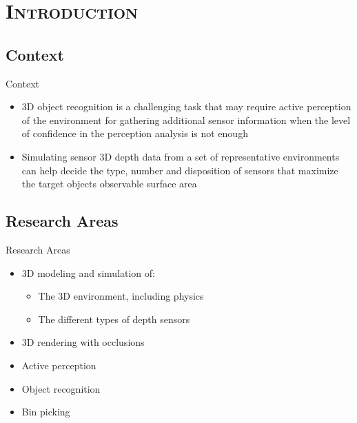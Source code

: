 \section{\scshape Introduction}\label{sec:introduction}

\subsection{Context}
\begin{frame}{Context}
	\begin{itemize}
		\item 3D object recognition is a challenging task that may require active perception of the environment for gathering additional sensor information when the level of confidence in the perception analysis is not enough
		\item Simulating sensor 3D depth data from a set of representative environments can help decide the type, number and disposition of sensors that maximize the target objects observable surface area
	\end{itemize}
\end{frame}


\subsection{Research Areas}
\begin{frame}{Research Areas}
	\begin{itemize}
		\item 3D modeling and simulation of:
		\begin{itemize}
			\item The 3D environment, including physics
			\item The different types of depth sensors
		\end{itemize}
		\item 3D rendering with occlusions
		\item Active perception
		\item Object recognition
		\item Bin picking
	\end{itemize}
\end{frame}

